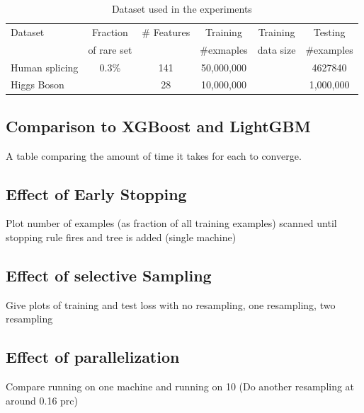\begin{table}[h]
\centering
\caption{Dataset used in the experiments}\label{tab:dataset}
\begin{tabular}{|l|ccccc|}
\cline{1-6}
Dataset         & Fraction    & \# Features & Training    &  Training  & Testing     \\
                & of rare set &             & \#exmaples  &  data size & \#examples  \\ \cline{1-6}
Human splicing  & 0.3\%       & 141         & 50,000,000  &            & 4627840     \\ \cline{1-6}
Higgs Boson     &             & 28          & 10,000,000  &            & 1,000,000   \\ \cline{1-6}
\end{tabular}
\end{table}

\subsection{Comparison to XGBoost and LightGBM}


A table comparing the amount of time it takes for each to converge.

\subsection{Effect of Early Stopping}
Plot number of examples (as fraction of all training examples) scanned until stopping rule fires and  tree is added (single machine)

\subsection{Effect of selective Sampling}
Give plots of training and test loss with no resampling, one resampling, two resampling

\subsection{Effect of parallelization}
Compare running on one machine and running on 10 (Do another resampling at around 0.16 prc)



\fi
